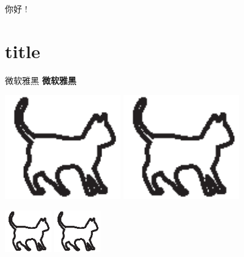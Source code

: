 \documentclass{ctexart}
\begin{document}
	你好 \LaTeXe !\part{title}
	
	微软雅黑
	\textbf{微软雅黑}
	
	\includegraphics[width=5cm]{cat.eps}
	\includegraphics[width=5cm]{cat.eps}
	

	\includegraphics[width=2cm]{cat.eps}
	\includegraphics[width=2cm]{cat.eps}
\end{document}
